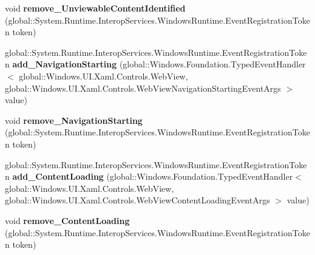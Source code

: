 \begin{DoxyCompactItemize}
\item 
\mbox{\label{interface_windows_1_1_u_i_1_1_xaml_1_1_controls_1_1_i_web_view2_a2882acdd93078aca17a084dda51aa7a7}} 
void {\bfseries remove\+\_\+\+Unviewable\+Content\+Identified} (global\+::\+System.\+Runtime.\+Interop\+Services.\+Windows\+Runtime.\+Event\+Registration\+Token token)
\item 
\mbox{\label{interface_windows_1_1_u_i_1_1_xaml_1_1_controls_1_1_i_web_view2_a23045b54a3bab5196d47fc172fd18d87}} 
global\+::\+System.\+Runtime.\+Interop\+Services.\+Windows\+Runtime.\+Event\+Registration\+Token {\bfseries add\+\_\+\+Navigation\+Starting} (global\+::\+Windows.\+Foundation.\+Typed\+Event\+Handler$<$ global\+::\+Windows.\+U\+I.\+Xaml.\+Controls.\+Web\+View, global\+::\+Windows.\+U\+I.\+Xaml.\+Controls.\+Web\+View\+Navigation\+Starting\+Event\+Args $>$ value)
\item 
\mbox{\label{interface_windows_1_1_u_i_1_1_xaml_1_1_controls_1_1_i_web_view2_a669f35cd29b2d8961a6c132444a73ddf}} 
void {\bfseries remove\+\_\+\+Navigation\+Starting} (global\+::\+System.\+Runtime.\+Interop\+Services.\+Windows\+Runtime.\+Event\+Registration\+Token token)
\item 
\mbox{\label{interface_windows_1_1_u_i_1_1_xaml_1_1_controls_1_1_i_web_view2_abc203b6881b1b76a4b7672b7fb427bda}} 
global\+::\+System.\+Runtime.\+Interop\+Services.\+Windows\+Runtime.\+Event\+Registration\+Token {\bfseries add\+\_\+\+Content\+Loading} (global\+::\+Windows.\+Foundation.\+Typed\+Event\+Handler$<$ global\+::\+Windows.\+U\+I.\+Xaml.\+Controls.\+Web\+View, global\+::\+Windows.\+U\+I.\+Xaml.\+Controls.\+Web\+View\+Content\+Loading\+Event\+Args $>$ value)
\item 
\mbox{\label{interface_windows_1_1_u_i_1_1_xaml_1_1_controls_1_1_i_web_view2_ae842c5ef69d1e7a4cea4c4e546878fc0}} 
void {\bfseries remove\+\_\+\+Content\+Loading} (global\+::\+System.\+Runtime.\+Interop\+Services.\+Windows\+Runtime.\+Event\+Registration\+Token token)
\item 

\end{DoxyCompactItemize}
